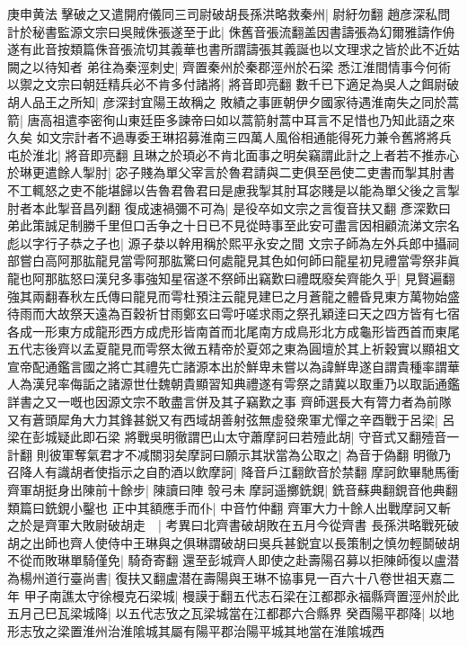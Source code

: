 庚申黄法擊破之又遣開府儀同三司尉破胡長孫洪略救秦州|{
	尉紆勿翻}
趙彦深私問計於秘書監源文宗曰吳賊侏張遂至于此|{
	侏舊音張流翻盖因書譸張為幻爾雅譸作侜遂有此音按類篇侏音張流切其義華也書所謂譸張其義誕也以文理求之皆於此不近姑闕之以待知者}
弟往為秦涇刺史|{
	齊置秦州於秦郡涇州於石梁}
悉江淮間情事今何術以禦之文宗曰朝廷精兵必不肯多付諸將|{
	將音即亮翻}
數千已下適足為吳人之餌尉破胡人品王之所知|{
	彦深封宜陽王故稱之}
敗績之事匪朝伊夕國家待遇淮南失之同於蒿箭|{
	唐高祖遣李密徇山東廷臣多諫帝曰如以蒿箭射蒿中耳言不足惜也乃知此語之來久矣}
如文宗計者不過專委王琳招募淮南三四萬人風俗相通能得死力兼令舊將將兵屯於淮北|{
	將音即亮翻}
且琳之於頊必不肯北面事之明矣竊謂此計之上者若不推赤心於琳更遣餘人掣肘|{
	宓子賤為單父宰言於魯君請與二吏俱至邑使二吏書而掣其肘書不工輒怒之吏不能堪歸以告魯君魯君曰是慮我掣其肘耳宓賤是以能為單父後之言掣肘者本此掣音昌列翻}
復成速禍彌不可為|{
	是役卒如文宗之言復音扶又翻}
彥深歎曰弟此策誠足制勝千里但口舌争之十日已不見從時事至此安可盡言因相顧流涕文宗名彪以字行子恭之子也|{
	源子㳟以幹用稱於熙平永安之間}
文宗子師為左外兵郎中攝祠部嘗白高阿那肱龍見當雩阿那肱驚曰何處龍見其色如何師曰龍星初見禮當雩祭非眞龍也阿那肱怒曰漢兒多事強知星宿遂不祭師出竊歎曰禮既廢矣齊能久乎|{
	見賢遍翻強其兩翻春秋左氏傳曰龍見而雩杜預注云龍見建巳之月蒼龍之體昏見東方萬物始盛待雨而大故祭天遠為百穀祈甘雨鄭玄曰雩吁嗟求雨之祭孔穎逹曰天之四方皆有七宿各成一形東方成龍形西方成虎形皆南首而北尾南方成鳥形北方成龜形皆西首而東尾五代志後齊以孟夏龍見而雩祭太微五精帝於夏郊之東為圓壇於其上祈穀實以顯祖文宣帝配通鑑言國之將亡其禮先亡諸源本出於鮮卑未嘗以為諱鮮卑遂自謂貴種率謂華人為漢兒率侮詬之諸源世仕魏朝貴顯習知典禮遂有雩祭之請冀以取重乃以取詬通鑑詳書之又一嘅也因源文宗不敢盡言併及其子竊歎之事}
齊師選長大有膂力者為前隊又有蒼頭犀角大力其鋒甚鋭又有西域胡善射弦無虛發衆軍尤憚之辛酉戰于呂梁|{
	呂梁在彭城疑此即石梁}
將戰吳明徹謂巴山太守蕭摩訶曰若殪此胡|{
	守音式又翻殪音一計翻}
則彼軍奪氣君才不减關羽矣摩訶曰願示其狀當為公取之|{
	為音于偽翻}
明徹乃召降人有識胡者使指示之自酌酒以飲摩訶|{
	降音戶江翻飲音於禁翻}
摩訶飲畢馳馬衝齊軍胡挺身出陳前十餘步|{
	陳讀曰陣}
彀弓未摩訶遥擲銑鋧|{
	銑音蘇典翻鋧音他典翻類篇曰銑鋧小鑿也}
正中其額應手而仆|{
	中音竹仲翻}
齊軍大力十餘人出戰摩訶又斬之於是齊軍大敗尉破胡走　|{
	考異曰北齊書破胡敗在五月今從齊書}
長孫洪略戰死破胡之出師也齊人使侍中王琳與之俱琳謂破胡曰吳兵甚鋭宜以長策制之慎勿輕鬬破胡不從而敗琳單騎僅免|{
	騎奇寄翻}
還至彭城齊人即使之赴壽陽召募以拒陳師復以盧潜為楊州道行臺尚書|{
	復扶又翻盧潜在壽陽與王琳不協事見一百六十八卷世祖天嘉二年}
甲子南譙太守徐槾克石梁城|{
	槾謨于翻五代志石梁在江都郡永福縣齊置涇州於此}
五月己巳瓦梁城降|{
	以五代志攷之瓦梁城當在江都郡六合縣界}
癸酉陽平郡降|{
	以地形志攷之梁置淮州治淮隂城其屬有陽平郡治陽平城其地當在淮隂城西}
